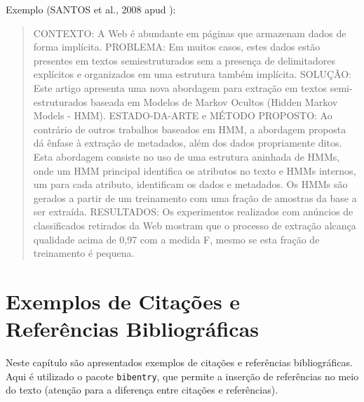 \documentclass[twoside,english,brazilian]{UNISINOSartigo}
\begin{document}
Exemplo (SANTOS et al., 2008 apud \citealp{Moro11}):
\begin{quote}
CONTEXTO: A Web é abundante em páginas que armazenam  dados de forma implícita. PROBLEMA: Em muitos casos, estes dados estão presentes em textos semiestruturados sem a presença de delimitadores explícitos e organizados em uma estrutura também implícita. SOLUÇÃO: Este artigo apresenta uma nova abordagem para extração em textos semi-estruturados baseada em Modelos de Markov Ocultos (Hidden Markov Models - HMM). ESTADO-DA-ARTE e MÉTODO PROPOSTO: Ao contrário de outros trabalhos baseados em HMM, a abordagem proposta dá ênfase à extração de metadados, além dos dados propriamente ditos. Esta abordagem consiste no uso de uma estrutura aninhada de HMMs, onde um HMM principal identifica os atributos no texto e HMMs internos, um para cada atributo, identificam os dados e metadados. Os HMMs são gerados a partir de um treinamento com uma fração de amostras da base a ser extraída. RESULTADOS: Os experimentos realizados com anúncios de classificados retirados da Web mostram que o processo de extração alcança qualidade acima de 0,97 com a medida F, mesmo se esta fração de treinamento é pequena. 
\end{quote}

\section{Exemplos de Citações e Referências Bibliográficas}
\nobibliography* %
Neste capítulo são apresentados exemplos de citações e referências bibliográficas.  Aqui é utilizado o pacote \texttt{bibentry}, que permite a inserção de referências no meio do texto (atenção para a diferença entre citações e referências).
\end{document}
